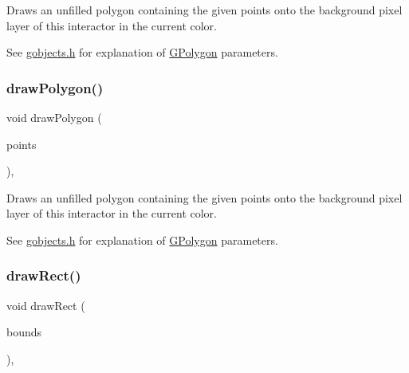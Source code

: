 Draws an unfilled polygon containing the given points onto the background pixel layer of this interactor in the current color. 

See \mbox{\hyperlink{gobjects_8h_source}{gobjects.\+h}} for explanation of \mbox{\hyperlink{classGPolygon}{G\+Polygon}} parameters. \mbox{\label{classGDrawingSurface_a021ee881e0d154dc4dd059698742889c}} 
\subsubsection{\texorpdfstring{draw\+Polygon()}{drawPolygon()}\hspace{0.1cm}{\footnotesize\ttfamily [2/2]}}
{\footnotesize\ttfamily void draw\+Polygon (\begin{DoxyParamCaption}\item[{std\+::initializer\+\_\+list$<$ \mbox{\hyperlink{structGPoint}{G\+Point}} $>$}]{points }\end{DoxyParamCaption})\hspace{0.3cm}{\ttfamily [virtual]}, {\ttfamily [inherited]}}



Draws an unfilled polygon containing the given points onto the background pixel layer of this interactor in the current color. 

See \mbox{\hyperlink{gobjects_8h_source}{gobjects.\+h}} for explanation of \mbox{\hyperlink{classGPolygon}{G\+Polygon}} parameters. \mbox{\label{classGDrawingSurface_a3dd4cc5891149dfc36746264f7289877}} 
\subsubsection{\texorpdfstring{draw\+Rect()}{drawRect()}\hspace{0.1cm}{\footnotesize\ttfamily [1/2]}}
{\footnotesize\ttfamily void draw\+Rect (\begin{DoxyParamCaption}\item[{const \mbox{\hyperlink{structGRectangle}{G\+Rectangle}} \&}]{bounds }\end{DoxyParamCaption})\hspace{0.3cm}{\ttfamily [virtual]}, {\ttfamily [inherited]}}



